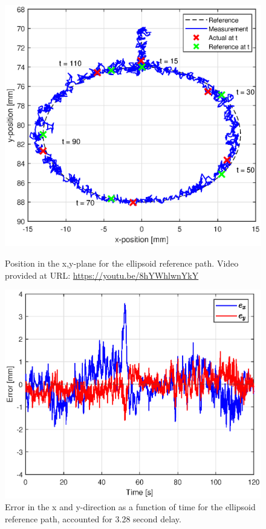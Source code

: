 \begin{figure}[H] 
    \begin{minipage}[b]{0.49\linewidth}
    \centering
    \includegraphics[width = \textwidth]{Figures/Chapter5/xy.eps}
    \caption{Position in the x,y-plane for the ellipsoid reference path. Video provided at URL: \url{https://youtu.be/8hYWhlwnYkY}}
    \label{fig5:xyelips}
       \end{minipage} 
    \begin{minipage}[b]{0.49\linewidth}
    \centering
    \includegraphics[width = \textwidth]{Figures/Chapter5/errorellipsdelayed.eps}
    \caption{Error in the x and y-direction as a function of time for the ellipsoid reference path, accounted for 3.28 second delay.}
    \label{fig5:errorelips}
    \end{minipage} 
\end{figure}

